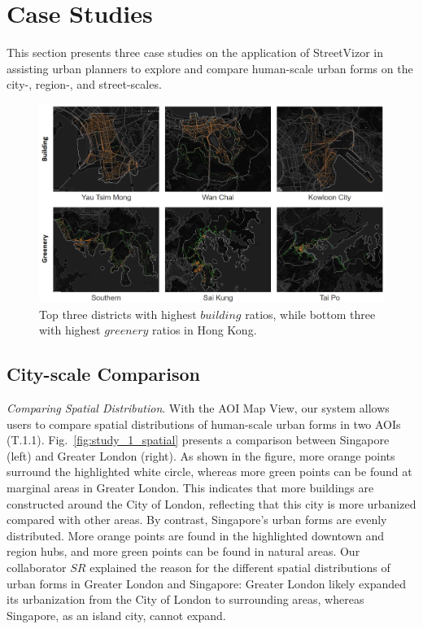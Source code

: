 \section{Case Studies}

This section presents three case studies on the application of StreetVizor in assisting urban planners to explore and compare human-scale urban forms on the city-, region-, and street-scales.


\begin{figure}[t]
	\centering
	\includegraphics[width=0.98\columnwidth]{figure/streetvizor/fig9_study_2/region-functionality.png}
	\vspace{-5mm}
	\caption{Top three districts with highest $building$ ratios, while bottom three with highest $greenery$ ratios in Hong Kong.}
	\label{fig:region-funcitonality}
	\vspace{-4mm}
\end{figure}

\subsection{City-scale Comparison}

\textit{Comparing Spatial Distribution}.
With the AOI Map View, our system allows users to compare spatial distributions of human-scale urban forms in two AOIs (T.1.1).
Fig.~\ref{fig:study_1_spatial} presents a comparison between Singapore (left) and Greater London (right).
As shown in the figure, more orange points surround the highlighted white circle, whereas more green points can be found at marginal areas in Greater London.
This indicates that more buildings are constructed around the City of London, reflecting that this city is more urbanized compared with other areas.
By contrast, Singapore's urban forms are evenly distributed.
More orange points are found in the highlighted downtown and region hubs, and more green points can be found in natural areas.
Our collaborator $SR$ explained the reason for the different spatial distributions of urban forms in Greater London and Singapore: Greater London likely expanded its urbanization from the City of London to surrounding areas, whereas Singapore, as an island city, cannot expand.

